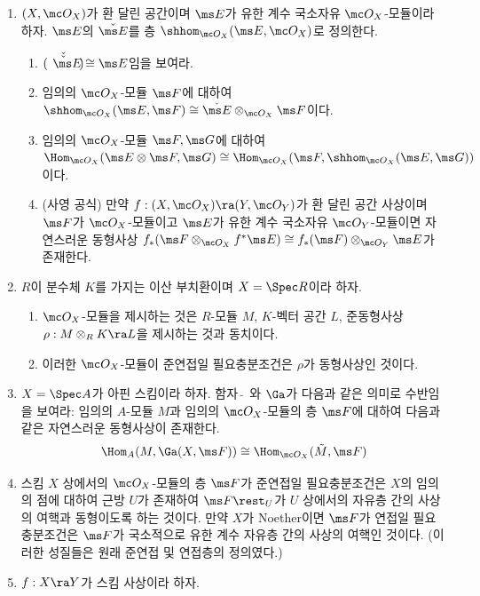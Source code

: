 	\begin{enumerate}[label=\tb{5.\arabic*.},itemindent=0mm,itemsep=2mm]
	\item $(X,\mc O_X)$가 환 달린 공간이며 $\ms E$가 유한 계수 국소자유 $\mc O_X$-모듈이라 하자.
	$\ms E$의  $\check{\ms E}$를 층 $\shhom_{\mc O_X}(\ms E,\mc O_X)$로 정의한다.
	\begin{enumerate}[label=(\alph*)]
	\item $\check{(\check{\ms E})}\cong\ms E$임을 보여라.
	\item 임의의 $\mc O_X$-모듈 $\ms F$에 대하여 $\shhom_{\mc O_X}(\ms E,\ms F)\cong\check{\ms E}\otimes_{\mc O_X}\ms F$이다.
	\item 임의의 $\mc O_X$-모듈 $\ms F,\ms G$에 대하여 $\Hom_{\mc O_X}(\ms E\otimes\ms F,\ms G)\cong
	\Hom_{\mc O_X}(\ms F,\shhom_{\mc O_X}(\ms E,\ms G))$이다.
	\item (사영 공식) 만약 $f:(X,\mc O_X)\ra(Y,\mc O_Y)$가 환 달린 공간 사상이며 $\ms F$가 $\mc O_X$-모듈이고
	$\ms E$가 유한 계수 국소자유 $\mc O_Y$-모듈이면
	자연스러운 동형사상 $f_*(\ms F\otimes_{\mc O_X}f^*\ms E)\cong f_*(\ms F)\otimes_{\mc O_Y}\ms E$가 존재한다.
	\end{enumerate}
	\item $R$이 분수체 $K$를 가지는 이산 부치환이며 $X=\Spec R$이라 하자.
	\begin{enumerate}[label=(\alph*)]
	\item $\mc O_X$-모듈을 제시하는 것은 $R$-모듈 $M$, $K$-벡터 공간 $L$, 준동형사상 $\rho:M\otimes_RK\ra L$을 제시하는 것과 동치이다.
	\item 이러한 $\mc O_X$-모듈이 준연접일 필요충분조건은 $\rho$가 동형사상인 것이다.
	\end{enumerate}
	\item $X=\Spec A$가 아핀 스킴이라 하자. 함자 $\tilde{\;}$ 와 $\Ga$가 다음과 같은 의미로 수반임을 보여라:
	임의의 $A$-모듈 $M$과 임의의 $\mc O_X$-모듈의 층 $\ms F$에 대하여 다음과 같은 자연스러운 동형사상이 존재한다.
	$$\Hom_A(M,\Ga(X,\ms F))\cong\Hom_{\mc O_X}(\tilde M,\ms F)$$
	\item 스킴 $X$ 상에서의 $\mc O_X$-모듈의 층 $\ms F$가 준연접일 필요충분조건은 $X$의 임의의 점에 대하여 근방 $U$가 존재하여
	$\ms F\rest_U$가 $U$ 상에서의 자유층 간의 사상의 여핵과 동형이도록 하는 것이다.
	만약 $X$가 Noether이면 $\ms F$가 연접일 필요충분조건은 $\ms F$가 국소적으로 유한 계수 자유층 간의 사상의 여핵인 것이다.
	(이러한 성질들은 원래 준연접 및 연접층의 정의였다.)
	\item $f:X\ra Y$가 스킴 사상이라 하자.

\end{enumerate}
